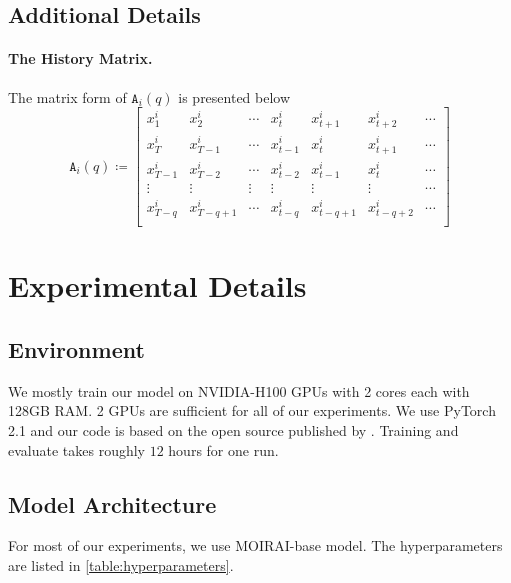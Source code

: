 \subsection{Additional Details}

\paragraph{The History Matrix.}
The matrix form of $\mathtt{A}_i(q)$ is presented below
\begin{equation}\label{eqn:history-matrix}
    \mathtt{A}_i(q)
    \coloneqq
    \begin{bmatrix}
        x_1^i & x_2^i & \cdots & x_t^i & x_{t+1}^i & x_{t+2}^i & \cdots \\
        x_T^i & x_{T-1}^i & \cdots & x_{t-1}^i & x_t^i & x_{t+1}^i & \cdots \\
        x_{T-1}^i & x_{T-2}^i & \cdots & x_{t-2}^i & x_{t-1}^i & x_{t}^i & \cdots \\
        \vdots & \vdots & \vdots & \vdots & \vdots & \vdots & \cdots \\
        x_{T-q}^i & x_{T-q+1}^i & \cdots & x_{t-q}^i & x_{t-q+1}^i & x_{t-q+2}^i & \cdots \\   
\end{bmatrix}
\end{equation}

\clearpage

\section{Experimental Details}\label{sec:exp-details}

\subsection{Environment}
We mostly train our model on NVIDIA-H100 GPUs with 2 cores each with 128GB RAM.
2 GPUs are sufficient for all of our experiments.
We use PyTorch 2.1 and our code is based on the open source published by \cite{woo2024unified}.
Training and evaluate takes roughly $12$ hours for one run.


\subsection{Model Architecture}
For most of our experiments, we use MOIRAI-base model.
The hyperparameters are listed in \cref{table:hyperparameters}.

